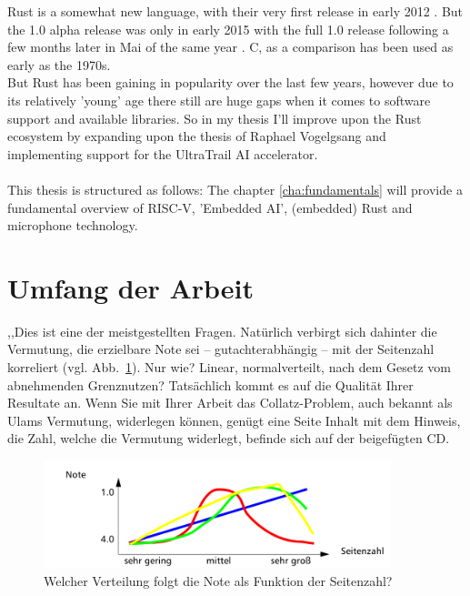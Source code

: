 

Rust \cite{rustlang} is a somewhat new language,
with their very first release in early 2012 \cite{rust_releases}.
But the 1.0 alpha release was only in early 2015 \cite{rust_releases}
with the full 1.0 release following a few months later in Mai of the same year \cite{rust_releases}.
C, as a comparison has been used as early as the 1970s.\\
But Rust has been gaining in popularity \cite{rust_popularity} over the last few years, however
due to its relatively 'young' age there still are huge gaps when it comes to software support and available libraries.
So in my thesis I'll improve upon the Rust ecosystem by expanding upon the thesis of Raphael Vogelgsang \cite{rust_pulp}
and implementing support for the UltraTrail \cite{ultratrail} AI accelerator.
\\\\
This thesis is structured as follows:
The chapter \ref{cha:fundamentals} will provide a fundamental overview of RISC-V, 'Embedded AI', (embedded) Rust and microphone technology.


\section{Umfang der Arbeit}
,,Dies ist eine der meistgestellten Fragen. Natürlich verbirgt sich dahinter die Vermutung, die erzielbare Note sei – gutachterabhängig – mit der Seitenzahl korreliert (vgl. Abb.~\ref{fig:graph}). Nur
wie? Linear, normalverteilt, nach dem Gesetz vom abnehmenden Grenznutzen?
Tatsächlich kommt es auf die Qualität Ihrer Resultate an. Wenn Sie mit Ihrer Arbeit das Collatz-Problem, auch bekannt als Ulams Vermutung, widerlegen können, genügt eine Seite Inhalt mit dem Hinweis, die Zahl, welche die Vermutung widerlegt, befinde sich auf der beigefügten CD.

\begin{figure}[htb]
  \centering
  \includegraphics[width=0.9\textwidth]{figures/note_page.png}
  \caption[Verteilung: Seitenanzahl-Note]{Welcher Verteilung folgt die Note als Funktion der Seitenzahl?}
  \label{fig:graph}
\end{figure}

